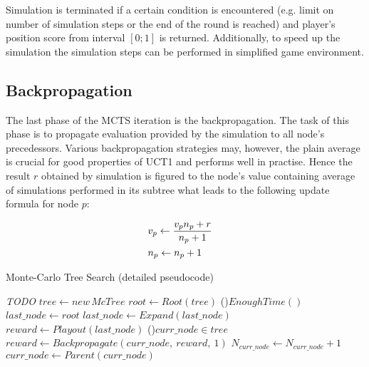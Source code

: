 Simulation is terminated if a certain condition is encountered (e.g. limit on number of simulation
steps or the end of the round is reached) and player's position score from interval $[0;1]$ is
returned. Additionally, to speed up the simulation the simulation steps can be performed in
simplified game environment.


\subsection{Backpropagation}

The last phase of the MCTS iteration is the backpropagation. The task of this phase is to propagate
evaluation provided by the simulation to all node's precedessors. Various backpropagation strategies
may, however, the plain average is crucial for good properties of UCT1 and performs well in
practise. Hence the result $r$ obtained by simulation is figured to the node's value containing
average of simulations performed in its subtree what leads to the following update formula for node
$p$:

\begin{align}
    &\begin{aligned}
        v_p &\leftarrow {{v_p n_p + r} \over{n_p + 1}}
    \end{aligned}\\
    &\begin{aligned}
        n_p &\leftarrow n_p + 1
    \end{aligned}
\end{align}




\begin{algorithm}
\DontPrintSemicolon
\caption{Monte-Carlo Tree Search (detailed pseudocode)}
\label{alg_mcts_loop_detailed}
\emph{TODO}\;
$tree \leftarrow new\,McTree$ \;
$root \leftarrow Root(tree)$\;
\While(){$EnoughTime()$}{
    $last\_node \leftarrow root$ \;
    $last\_node \leftarrow Expand(last\_node)$ \;
    $reward \leftarrow Playout(last\_node)$ \;
    \While(){$curr\_node \in tree$}{
        $reward \leftarrow Backpropagate(curr\_node,\:reward,\:1)$\;
        $N_{curr\_node} \leftarrow N_{curr\_node}+1$ \;
        $curr\_node \leftarrow Parent(curr\_node)$\;
    }
}
 \;
\end{algorithm}

